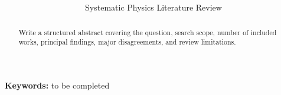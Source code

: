 \documentclass[12pt,openany]{report}
\title{\bfseries\color{ReviewNavy}\ReviewTitle}
\author{Systematic Physics Literature Review}
\date{\ReviewDate}
\begin{document}
\maketitle

\begin{abstract}
Write a structured abstract covering the question, search scope, number of included works, principal findings, major disagreements, and review limitations.
\end{abstract}

\noindent\textbf{Keywords:} to be completed

\tableofcontents

\begin{center}
\end{center}

% 
% 
% 



\end{document}
